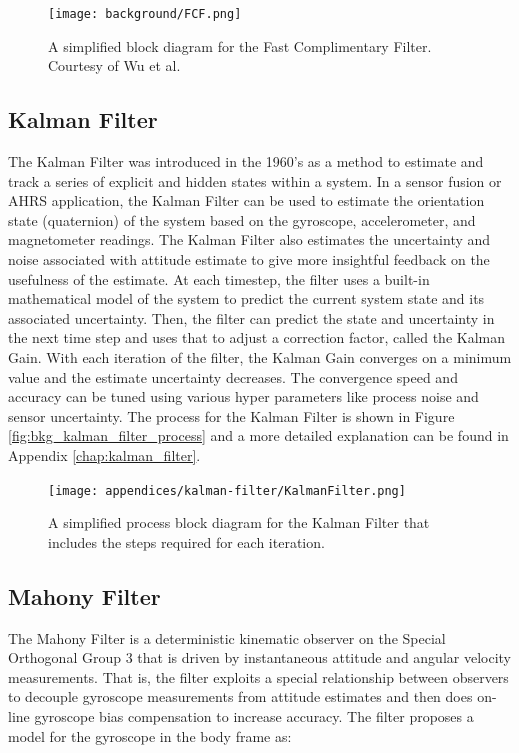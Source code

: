 \begin{figure}
    \centering
    \caption[Fast Complimentary Filter]{A simplified block diagram for the Fast Complimentary Filter. 
    Courtesy of Wu et al. \cite{FCF:2016}}
    \texttt{[image: background/FCF.png]}
\end{figure}

\subsection{Kalman Filter} 
The Kalman Filter \cite{Kalman:1960} was introduced in the 1960's as a method to estimate and track a series of explicit and hidden states within a system.
In a sensor fusion or AHRS application, the Kalman Filter can be used to estimate the orientation state (quaternion) of the system based on the gyroscope, accelerometer, and magnetometer readings.
The Kalman Filter also estimates the uncertainty and noise associated with attitude estimate to give more insightful feedback on the usefulness of the estimate.
At each timestep, the filter uses a built-in mathematical model of the system to predict the current system state and its associated uncertainty.
Then, the filter can predict the state and uncertainty in the next time step and uses that to adjust a correction factor, called the Kalman Gain.
With each iteration of the filter, the Kalman Gain converges on a minimum value and the estimate uncertainty decreases.
The convergence speed and accuracy can be tuned using various hyper parameters like process noise and sensor uncertainty.
The process for the Kalman Filter is shown in Figure \ref{fig:bkg_kalman_filter_process} and a more detailed explanation can be found in Appendix \ref{chap:kalman_filter}.

\begin{figure}
    \centering
    \caption[Kalman Filter Process]{A simplified process block diagram for the Kalman Filter that includes the steps required for each iteration.}
    \texttt{[image: appendices/kalman-filter/KalmanFilter.png]}
\end{figure}

\subsection{Mahony Filter} 
The Mahony Filter \cite{Mahony:2008} is a deterministic kinematic observer on the Special Orthogonal Group 3 that is driven by instantaneous attitude and angular velocity measurements.
That is, the filter exploits a special relationship between observers to decouple gyroscope measurements from attitude estimates and then does on-line gyroscope bias compensation to increase accuracy.
The filter proposes a model for the gyroscope in the body frame as:

